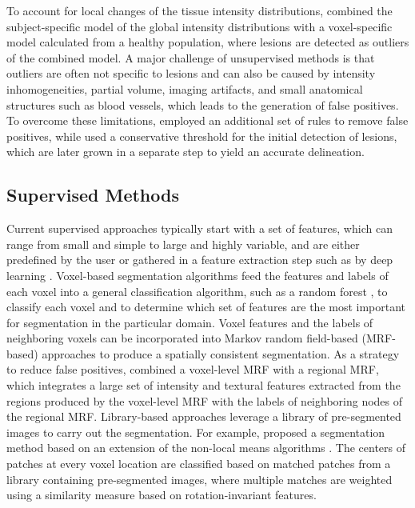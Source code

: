 To account for local changes of the tissue intensity distributions,
\citet{tomas2015} combined the subject-specific model of
the global intensity distributions with a voxel-specific model calculated from a
healthy population, where lesions are detected as outliers of the combined
model. A major challenge of unsupervised methods is that outliers are often not
specific to lesions and can also be caused by intensity inhomogeneities, partial
volume, imaging artifacts, and small anatomical structures such as blood
vessels, which leads to the generation of false positives. To overcome these
limitations, \citet{roura2015} employed an additional set of rules
to remove false positives, while \citet{schmidt2012automated} used
a conservative threshold for the initial detection of lesions, which are later
grown in a separate step to yield an accurate delineation.

\subsection[Supervised methods]{Supervised Methods}

Current supervised approaches typically start with a set of features, which can
range from small and simple to large and highly variable, and are either
predefined by the user \citep{geremia2010,guizard2015,subbanna2015} or gathered
in a feature extraction step such as by deep learning \citep{yoo2014}.
Voxel-based segmentation algorithms \citep{geremia2010,yoo2014} feed the
features and labels of each voxel into a general classification algorithm, such
as a random forest \citep{breiman2001}, to classify each voxel and to determine
which set of features are the most important for segmentation in the particular
domain. Voxel features and the labels of neighboring voxels can be incorporated
into Markov random field-based (MRF-based) approaches
\citep{subbanna2009,subbanna2015} to produce a spatially consistent
segmentation. As a strategy to reduce false positives, \citet{subbanna2015}
combined a voxel-level MRF with a regional MRF, which integrates a large set of
intensity and textural features extracted from the regions produced by the
voxel-level MRF with the labels of neighboring nodes of the regional MRF.
Library-based approaches leverage a library of pre-segmented images to carry out
the segmentation. For example, \citet{guizard2015} proposed a segmentation
method based on an extension of the non-local means algorithms
\citep{coupe2011}. The centers of patches at every voxel location are classified
based on matched patches from a library containing pre-segmented images, where
multiple matches are weighted using a similarity measure based on
rotation-invariant features.

